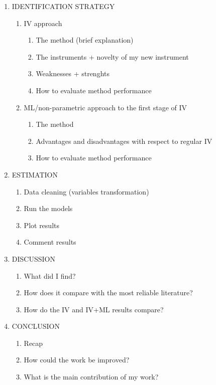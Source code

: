 \documentclass{article}
\begin{document}
\begin{enumerate}
    \item IDENTIFICATION STRATEGY
    \begin{enumerate}
        \item IV approach
        \begin{enumerate}
            \item The method (brief explanation)
            \item The instruments + novelty of my new instrument
            \item Weaknesses + strenghts
            \item How to evaluate method performance
        \end{enumerate}
        \item ML/non-parametric approach to the first stage of IV
        \begin{enumerate}
            \item The method
            \item Advantages and disadvantages with respect to regular IV
            \item How to evaluate method performance
        \end{enumerate} 
    \end{enumerate}

    \item ESTIMATION
    \begin{enumerate}
        \item Data cleaning (variables transformation)
        \item Run the models
        \item Plot results
        \item Comment results
    \end{enumerate}

    \item DISCUSSION
    \begin{enumerate}
        \item What did I find?
        \item How does it compare with the most reliable literature?
        \item How do the IV and IV+ML results compare?
    \end{enumerate}

    \item CONCLUSION
    \begin{enumerate}
        \item Recap
        \item How could the work be improved?
        \item What is the main contribution of my work?
    \end{enumerate}

\end{enumerate}
\end{document}
